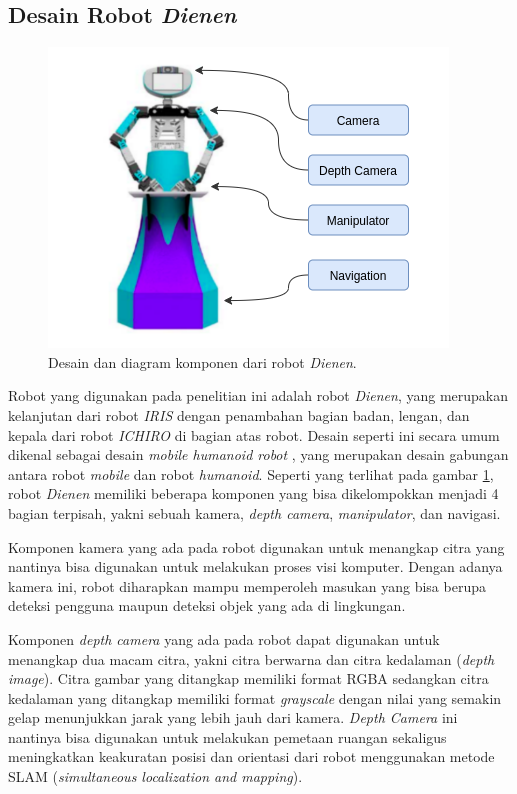 \subsection{Desain Robot \emph{Dienen}}
\label{subsec:desainrobotdienen}

\begin{figure}[ht]
  \centering
  \includegraphics[scale=0.5]{gambar/komponen-robot.png}
  \caption{Desain dan diagram komponen dari robot \emph{Dienen}.}
  \label{fig:komponenrobot}
\end{figure}

Robot yang digunakan pada penelitian ini adalah robot \emph{Dienen},
  yang merupakan kelanjutan dari robot \emph{IRIS} \citep{cit:dikairono2020}\citep{cit:zanuar2019} dengan penambahan bagian badan, lengan, dan kepala dari robot \emph{ICHIRO} \citep{cit:muhtadin2019} di bagian atas robot.
Desain seperti ini secara umum dikenal sebagai desain \emph{mobile humanoid robot} \citep{cit:mohamed2012}, yang merupakan desain gabungan antara robot \emph{mobile} dan robot \emph{humanoid}.
Seperti yang terlihat pada gambar \ref{fig:komponenrobot},
  robot \emph{Dienen} memiliki beberapa komponen yang bisa dikelompokkan menjadi 4 bagian terpisah, yakni sebuah kamera, \emph{depth camera}, \emph{manipulator}, dan navigasi.

Komponen kamera yang ada pada robot digunakan untuk menangkap citra yang nantinya bisa digunakan untuk melakukan proses visi komputer.
Dengan adanya kamera ini, robot diharapkan mampu memperoleh masukan yang bisa berupa deteksi pengguna maupun deteksi objek yang ada di lingkungan.

Komponen \emph{depth camera} yang ada pada robot dapat digunakan untuk menangkap dua macam citra,
  yakni citra berwarna dan citra kedalaman (\emph{depth image}).
Citra gambar yang ditangkap memiliki format RGBA sedangkan citra kedalaman yang ditangkap memiliki format \emph{grayscale} dengan nilai yang semakin gelap menunjukkan jarak yang lebih jauh dari kamera.
\emph{Depth Camera} ini nantinya bisa digunakan untuk melakukan pemetaan ruangan sekaligus meningkatkan keakuratan posisi dan orientasi dari robot menggunakan metode SLAM (\emph{simultaneous localization and mapping}).


